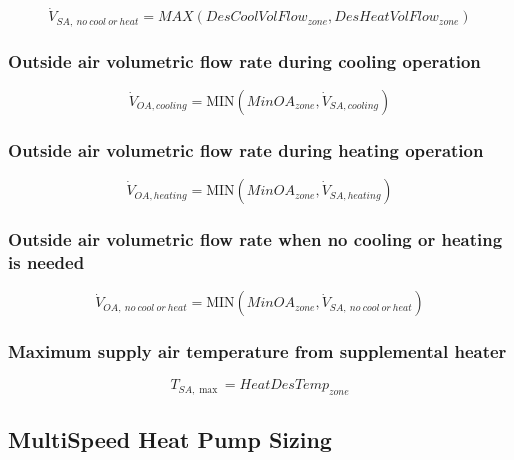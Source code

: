 \begin{equation}
\dot V_{SA,~no~cool~or~heat}  = MAX(DesCoolVolFlow_{zone},DesHeatVolFlow_{zone})
\end{equation}

\subsubsection{Outside air volumetric flow rate during cooling operation}\label{outside-air-volumetric-flow-rate-during-cooling-operation}

\begin{equation}
\dot V_{OA,cooling} = {\mathrm{MIN}}(MinO{A_{zone}},\dot V_{SA,cooling})
\end{equation}

\subsubsection{Outside air volumetric flow rate during heating operation}\label{outside-air-volumetric-flow-rate-during-heating-operation}

\begin{equation}
\dot V_{OA,heating} = {\mathrm{MIN}}(MinO{A_{zone}},\dot V_{SA,heating})
\end{equation}

\subsubsection{Outside air volumetric flow rate when no cooling or heating is needed}\label{outside-air-volumetric-flow-rate-when-no-cooling-or-heating-is-needed}

\begin{equation}
\dot V_{OA,~no~cool~or~heat} = {\mathrm{MIN}}(MinO{A_{zone}},\dot V_{SA,~no~cool~or~heat})
\end{equation}

\subsubsection{Maximum supply air temperature from supplemental heater}\label{maximum-supply-air-temperature-from-supplemental-heater}

\begin{equation}
{T_{SA,\max }} = HeatDesTem{p_{zone}}
\end{equation}

\subsection{MultiSpeed Heat Pump Sizing}\label{multispeed-heat-pump-sizing}

